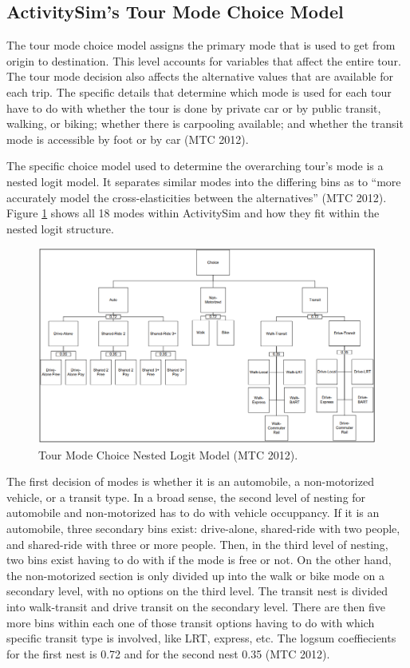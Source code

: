 \documentclass[12pt, oneside, openright]{byuthesis}
\begin{document}
\hypertarget{lit41}{%
\subsection{ActivitySim's Tour Mode Choice Model}\label{lit41}}

The tour mode choice model assigns the primary mode that is used to get from origin to destination. This level accounts for variables that affect the entire tour. The tour mode decision also affects the alternative values that are available for each trip. The specific details that determine which mode is used for each tour have to do with whether the tour is done by private car or by public transit, walking, or biking; whether there is carpooling available; and whether the transit mode is accessible by foot or by car (MTC 2012).

The specific choice model used to determine the overarching tour's mode is a nested logit model. It separates similar modes into the differing bins as to ``more accurately model the cross-elasticities between the alternatives'' (MTC 2012). Figure \ref{fig:fig1} shows all 18 modes within ActivitySim and how they fit within the nested logit structure.

\begin{figure}

{\centering \includegraphics[width=1\linewidth]{pics/tour_nest} 

}

\caption{Tour Mode Choice Nested Logit Model (MTC 2012).}\label{fig:fig1}
\end{figure}

The first decision of modes is whether it is an automobile, a non-motorized vehicle, or a transit type. In a broad sense, the second level of nesting for automobile and non-motorized has to do with vehicle occuppancy. If it is an automobile, three secondary bins exist: drive-alone, shared-ride with two people, and shared-ride with three or more people. Then, in the third level of nesting, two bins exist having to do with if the mode is free or not. On the other hand, the non-motorized section is only divided up into the walk or bike mode on a secondary level, with no options on the third level. The transit nest is divided into walk-transit and drive transit on the secondary level. There are then five more bins within each one of those transit options having to do with which specific transit type is involved, like LRT, express, etc. The logsum coeffiecients for the first nest is 0.72 and for the second nest 0.35 (MTC 2012).
\end{document}
